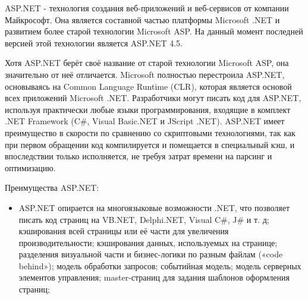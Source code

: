 \documentclass[14pt,a4paper]{extreport}
\begin{document}
	\flushleft\hspace{4ex}ASP.NET  - технология создания веб-приложений и веб-сервисов от компании Майкрософт. Она является составной частью платформы Microsoft .NET и развитием более старой технологии Microsoft ASP. На данный момент последней версией этой технологии является ASP.NET 4.5.\par
 	\hspace{4ex}Хотя ASP.NET берёт своё название от старой технологии Microsoft ASP, она значительно от неё отличается. Microsoft полностью перестроила ASP.NET, основываясь на Common Language Runtime (CLR), которая является основой всех приложений Microsoft .NET. Разработчики могут писать код для ASP.NET, используя практически любые языки программирования, входящие в комплект .NET Framework (C\#, Visual Basic.NET и JScript .NET). ASP.NET имеет преимущество в скорости по сравнению со скриптовыми технологиями, так как при первом обращении код компилируется и помещается в специальный кэш, и впоследствии только исполняется, не требуя затрат времени на парсинг и оптимизацию.\par
	\hspace{4ex}Преимущества ASP.NET:\par
\begin{itemize}
	 код выполняется быстрее, большинство ошибок отлавливается ещё на стадии разработки;
	 улучшенная обработка ошибок во время выполнения запущеной готовой программы, с использованием блоков try..catch;
	 элементы управления (controls) позволяют
выделять часто используемые шаблоны, такие как меню сайта;
	 метафор, уже применяющихся в Windows-приложениях, например, таких как элементы управления и события;
	 набор элементов управления и библиотек классов позволяет быстрее разрабатывать приложения;
	\item ASP.NET опирается на многоязыковые возможности .NET, что позволяет писать код страниц на VB.NET, Delphi.NET, Visual C\#, J\# и т. д;
	 кэширования всей страницы или её части для увеличения производительности;
	 кэширования данных, используемых на странице;
	 разделения визуальной части и бизнес-логики по разным файлам («code behind»);
	 модель обработки запросов;
	 событийная модель;
	 модель серверных элементов управления;
	 master-страниц для задания шаблонов оформления страниц; 
\end{itemize}      
         
\end{document}
